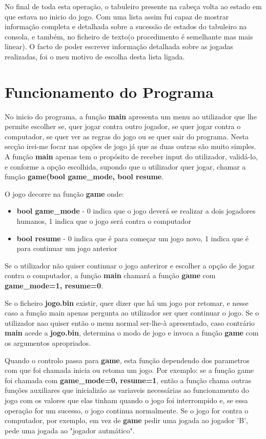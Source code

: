 \documentclass[14pt]{extarticle}
\begin{document}
No final de toda esta operação, o tabuleiro presente na cabeça volta ao estado em que estava no inicio do jogo. Com uma lista assim fui capaz de mostrar informação completa e detalhada sobre a sucessão de estados do tabuleiro na consola, e também, no ficheiro de texto(o procedimento é semelhante mas mais linear). O facto de poder escrever informação detalhada sobre as jogadas realizadas, foi o meu motivo de escolha desta lista ligada.

\newpage
\section{Funcionamento do Programa}
No inicio do programa, a função \textbf{main} apresenta um menu ao utilizador que lhe permite escolher se, quer jogar contra outro jogador, se quer jogar contra o computador, se quer ver as regras do jogo ou se quer sair do programa. Nesta secção irei-me focar nas opções de jogo já que as duas outras são muito simples. A função \textbf{main} apenas tem o propósito de receber input do utilizador, validá-lo, e conforme a opção escolhida, supondo que o utilizador quer jogar, chamar a função \textbf{game(bool game\_mode, bool resume}.

O jogo decorre na função \textbf{game} onde:
\begin{itemize}
\item \textbf{bool game\_mode} - 0 indica que o jogo deverá se realizar a dois jogadores humanos, 1 indica que o jogo será contra o computador
\item \textbf{bool resume} - 0 indica que é para começar um jogo novo, 1 indica que é para continuar um jogo anterior
\end{itemize}

Se o utilizador não quiser continuar o jogo anteriror e escolher a opção de jogar contra o computador, a função \textbf{main} chamará a função \textbf{game} com \textbf{game\_mode=1, resume=0}.

Se o ficheiro \textbf{jogo.bin} existir, quer dizer que há um jogo por retomar, e nesse caso a função main apenas pergunta ao utilizador ser quer continuar o jogo. Se o utilizador nao quiser então o menu normal ser-lhe-à apresentado, caso contrário \textbf{main} acede a \textbf{jogo.bin}, determina o modo de jogo e invoca a função \textbf{game} com os argumentos apropriados.

Quando o controlo passa para \textbf{game}, esta função dependendo dos parametros com que foi chamada inicia ou retoma um jogo. Por exemplo: se a função game foi chamada com \textbf{game\_mode=0, resume=1}, então a função chama outras funções auxiliares que inicializão as variaveis necessárias ao funcionamento do jogo com os valores que elas tinham quando o jogo foi interrompido e, se essa operação for um sucesso, o jogo continua normalmente. Se o jogo for contra o computador, por exemplo, em vez de \textbf{game} pedir uma jogada ao jogador 'B', pede uma jogada ao "jogador autmático".
\end{document}
